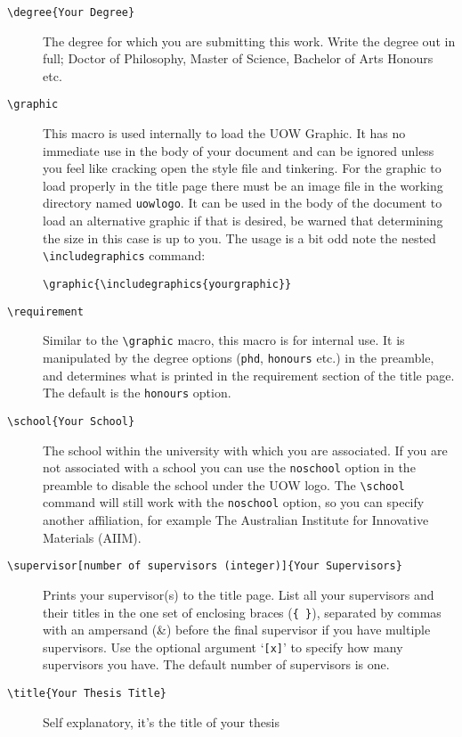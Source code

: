 \documentclass[12pt,oneside]{article}
\newcommand{\oporcom}[1]{\texttt{\color{RoyalBlue}#1}} %
\newcommand{\comoptions}[1]{\texttt{\color{Gray}#1}} %
\begin{document}
\begin{description}
    \item[\oporcom{\textbackslash{}degree}\comoptions{\{Your Degree\}}] The degree for which you are submitting this work. Write the degree out in full; Doctor of Philosophy, Master of Science, Bachelor of Arts Honours etc.
    
    \item[\oporcom{\textbackslash{}graphic}] This macro is used internally to load the UOW Graphic. It has no immediate use in the body of your document and can be ignored unless you feel like cracking open the style file and tinkering. For the graphic to load properly in the title page there must be an image file in the working directory named \texttt{uow\textunderscore{}logo}. It can be used in the body of the document to load an alternative graphic if that is desired, be warned that determining the size in this case is up to you.
    The usage is a bit odd note the nested \oporcom{\textbackslash{}includegraphics} command:
    
    \oporcom{\textbackslash{}graphic}\comoptions{\{\textbackslash{}includegraphics\{yourgraphic\}\}}
    
    \item[\oporcom{\textbackslash{}requirement}] Similar to the \oporcom{\textbackslash{}graphic} macro, this macro is for internal use. It is manipulated by the degree options (\oporcom{phd}, \oporcom{honours} etc.) in the preamble, and determines what is printed in the requirement section of the title page. The default is the \oporcom{honours} option.
    
    \item[\oporcom{\textbackslash{}school}\comoptions{\{Your School\}}] The school within the university with which you are associated. If you are not associated with a school you can use the \oporcom{noschool} option in the preamble to disable the school under the UOW logo. The \oporcom{\textbackslash{}school} command will still work with the \oporcom{noschool} option, so you can specify another affiliation, for example The Australian Institute for Innovative Materials (AIIM).
    
    \item[\oporcom{\textbackslash{}supervisor}\comoptions{[number of supervisors (integer)]\{Your Supervisors\}}] Prints your supervisor(s) to the title page. List all your supervisors and their titles in the one set of enclosing braces (\texttt{\{ \}}), separated by commas with an ampersand (\&) before the final supervisor if you have multiple supervisors. Use the optional argument `\texttt{[x]}' to specify how many supervisors you have. The default number of supervisors is one.
    
    \item[\oporcom{\textbackslash{}title}\comoptions{\{Your Thesis Title\}}] Self explanatory, it's the title of your thesis
\end{description}
\end{document}
